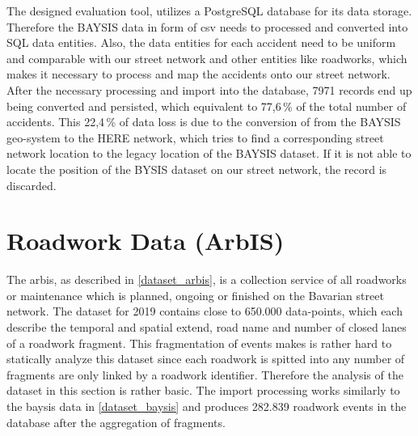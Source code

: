 The designed evaluation tool, utilizes a PostgreSQL database for its data storage. Therefore the BAYSIS data in form of \acrfull{csv} needs to processed and converted into SQL data entities. Also, the data entities for each accident need to be uniform and comparable with our street network and other entities like roadworks, which makes it necessary to process and map the accidents onto our street network. After the necessary processing and import into the database, 7971 records end up being converted and persisted, which equivalent to 77,6\,\% of the total number of accidents. This 22,4\,\% of data loss is due to the conversion of from the BAYSIS geo-system to the HERE network, which tries to find a corresponding street network location to the legacy location of the BAYSIS dataset. If it is not able to locate the position of the BYSIS dataset on our street network, the record is discarded.

\section{Roadwork Data (ArbIS)}
\label{dataset_arbis}

The \acrfull{arbis}, as described in \autoref{dataset_arbis}, is a collection service of all roadworks or maintenance which is planned, ongoing or finished on the Bavarian street network. The dataset for 2019 contains close to 650.000 data-points, which each describe the temporal and spatial extend, road name and number of closed lanes of a roadwork fragment. This fragmentation of events makes is rather hard to statically analyze this dataset since each roadwork is spitted into any number of fragments are only linked by a roadwork identifier. Therefore the analysis of the dataset in this section is rather basic. The import processing works similarly to the \acrshort{baysis} data in \autoref{dataset_baysis} and produces 282.839 roadwork events in the database after the aggregation of fragments. 

